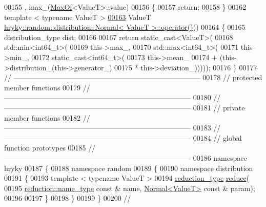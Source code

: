 \begin{DoxyCode}
00155       , max\_(\hyperlink{classhryky_1_1_max_of}{MaxOf}<ValueT>::value)
00156 \{
00157     \textcolor{keywordflow}{return};
00158 \}
00162 \textcolor{keyword}{template} < \textcolor{keyword}{typename} ValueT >
\hypertarget{random__distribution__normal_8h_source_l00163}{}\hyperlink{classhryky_1_1random_1_1distribution_1_1_normal_aabd419dba5f1af0d5b661619c49632da}{00163} ValueT \hyperlink{classhryky_1_1random_1_1distribution_1_1_normal}{hryky::random::distribution::Normal< ValueT >::operator()}()
00164 \{
00165     distribution\_type dist;
00166 
00167     \textcolor{keywordflow}{return} \textcolor{keyword}{static\_cast<}ValueT\textcolor{keyword}{>}(
00168         std::min<int64\_t>(
00169             this->max\_,
00170             std::max<int64\_t>(
00171                 this->min\_,
00172                 \textcolor{keyword}{static\_cast<}int64\_t\textcolor{keyword}{>}(
00173                     this->mean\_
00174                     + (this->distribution\_(this->generator\_)
00175                        * this->deviation\_)))));
00176 \}
00177 \textcolor{comment}{//
      ------------------------------------------------------------------------------}
00178 \textcolor{comment}{// protected member functions}
00179 \textcolor{comment}{//
      ------------------------------------------------------------------------------}
00180 \textcolor{comment}{//
      ------------------------------------------------------------------------------}
00181 \textcolor{comment}{// private member functions}
00182 \textcolor{comment}{//
      ------------------------------------------------------------------------------}
00183 \textcolor{comment}{//
      ------------------------------------------------------------------------------}
00184 \textcolor{comment}{// global function prototypes}
00185 \textcolor{comment}{//
      ------------------------------------------------------------------------------}
00186 \textcolor{keyword}{namespace }hryky
00187 \{
00188 \textcolor{keyword}{namespace }random
00189 \{
00190 \textcolor{keyword}{namespace }distribution
00191 \{
00193     \textcolor{keyword}{template} < \textcolor{keyword}{typename} ValueT > 
00194     \hyperlink{classhryky_1_1_intrusive_ptr}{reduction_type} \hyperlink{namespacehryky_1_1random_1_1distribution_a036b49db88fa8504b2a893ce60f9ad03}{reduce}(
00195         \hyperlink{classhryky_1_1reduction_1_1_string}{reduction::name_type} \textcolor{keyword}{const} & name, \hyperlink{classhryky_1_1random_1_1distribution_1_1_normal}{Normal<ValueT>} \textcolor{keyword}{const} & param);
00196 
00197 \}
00198 \}
00199 \}
00200 \textcolor{comment}{//
}
\end{DoxyCode}
